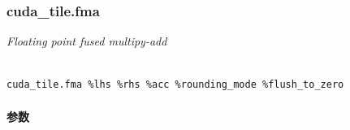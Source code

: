 \documentclass{article}
\begin{document}
\subsubsection{cuda\_tile.fma}


\textit{Floating point fused multipy-add}




\begin{lstlisting}

cuda_tile.fma %lhs %rhs %acc %rounding_mode %flush_to_zero

\end{lstlisting}



\paragraph{参数}
\end{document}
